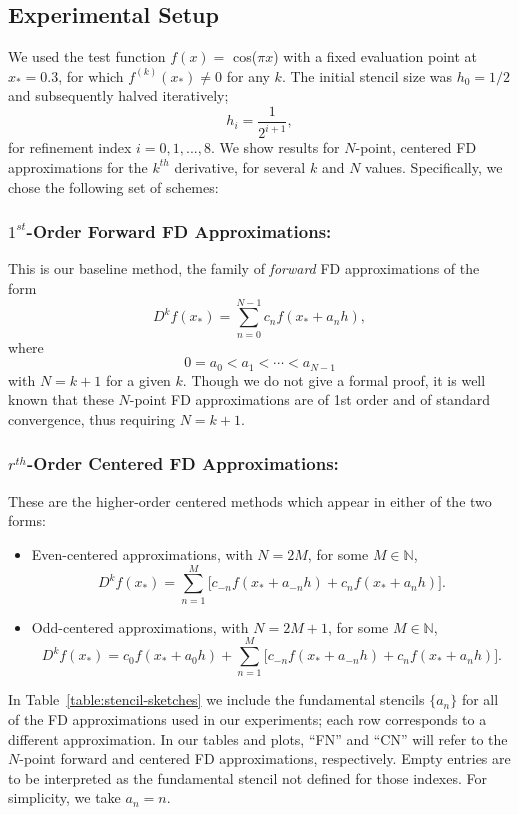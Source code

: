\documentclass[12pt]{article}
\newcommand{\xstar}{x_*}
\newcommand{\FD}{D}
\begin{document}
\subsection{Experimental Setup}
We used the test function $f(x)=$ cos($\pi x$) with a fixed evaluation point at  $\xstar = 0.3$, for which $f^{(k)}(\xstar)\neq0$ for any $k$.
The initial stencil size was $h_0 = 1/2$ and subsequently halved iteratively;
\[
	h_i = \frac{1}{2^{i+1}}, 
\]
for refinement index $i=0,1,...,8$.
We show results for $N$-point, centered FD approximations for the $k^{th}$ derivative, for several $k$ and $N$ values.
Specifically, we chose the following set of schemes:

%
\subsubsection*{$1^{st}$-Order Forward FD Approximations:} 
This is our baseline method, the family of \textit{forward} FD approximations of the form
\[
    \FD^k f(\xstar) = \sum_{n=0}^{N-1} c_n f(\xstar+a_nh),
\]
where 
\[
	0 = a_0 < a_1 < \cdots < a_{N-1}
\]
with $N=k+1$ for a given $k$.
Though we do not give a formal proof, it is well known that these $N$-point FD approximations are of 1st order and of standard convergence, thus requiring $N=k+1$. 

%
\subsubsection*{$r^{th}$-Order Centered FD Approximations:} 
These are the higher-order centered methods which appear in either of the two forms:
\begin{itemize}
    \item Even-centered approximations, with $N=2M$, for some $M\in\mathbb N$,
    \[
        \FD^k f(\xstar) = \sum_{n=1}^{M} \Big[c_{-n} f(\xstar+a_{-n}h)+c_n f(\xstar+a_nh)\Big].
    \] 

    \item Odd-centered approximations, with $N=2M+1$, for some $M\in\mathbb N$,
    \[
        \FD^k f(\xstar) = c_0f(\xstar+a_0h) + \sum_{n=1}^{M}\Big[ c_{-n} f(\xstar+a_{-n}h)+c_n f(\xstar+a_nh)\Big].
    \]
\end{itemize}

In Table~\ref{table:stencil-sketches} we include the fundamental stencils $\{a_n\}$ for all of the FD approximations used in our experiments; each row corresponds to a different approximation.
In our tables and plots, ``FN'' and ``CN'' will refer to the $N$-point forward and centered FD approximations, respectively.
Empty entries are to be interpreted as the fundamental stencil not defined for those indexes.
For simplicity, we take $a_n = n$.
\end{document}
